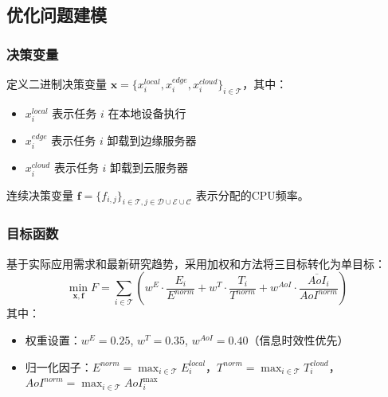 \documentclass[conference]{IEEEtran}
\begin{document}
\subsection{优化问题建模}
\subsubsection{决策变量}
定义二进制决策变量 $\mathbf{x} = \{x_i^{local}, x_i^{edge}, x_i^{cloud}\}_{i \in \mathcal{T}}$，其中：
\begin{itemize}
    \item $x_{i}^{local}$ 表示任务 $i$ 在本地设备执行
    \item $x_{i}^{edge}$ 表示任务 $i$ 卸载到边缘服务器
    \item $x_{i}^{cloud}$ 表示任务 $i$ 卸载到云服务器
\end{itemize}
连续决策变量 $\mathbf{f} = \{f_{i,j}\}_{i \in \mathcal{T}, j \in \mathcal{D} \cup \mathcal{E} \cup \mathcal{C}}$ 表示分配的CPU频率。

\subsubsection{目标函数}
基于实际应用需求和最新研究趋势，采用加权和方法将三目标转化为单目标：
\begin{equation}
    \min_{\mathbf{x}, \mathbf{f}} F 
    = \sum_{i \in \mathcal{T}} \left( w^E \cdot \frac{E_i}{E^{norm}} + w^T \cdot \frac{T_i}{T^{norm}} + w^{AoI} \cdot \frac{\overline{AoI}_i}{AoI^{norm}} \right)
\end{equation}
其中：
\begin{itemize}
    \item 权重设置：$w^E = 0.25$, $w^T = 0.35$, $w^{AoI} = 0.40$（信息时效性优先）
    \item 归一化因子：$E^{norm} = \max_{i \in \mathcal{T}} E_i^{local}$，$T^{norm} = \max_{i \in \mathcal{T}} T_i^{cloud}$，$AoI^{norm} = \max_{i \in \mathcal{T}} AoI_i^{\max}$
\end{itemize}
\end{document}

